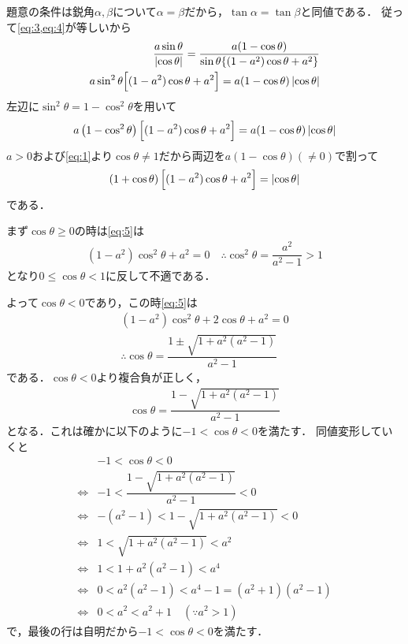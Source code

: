 \documentclass[../../main.tex]{subfiles}
\begin{document}
題意の条件は鋭角$\alpha,\beta$について$\alpha=\beta$だから，$\tan\alpha=\tan\beta$と同値である．
従って\cref{eq:3,eq:4}が等しいから
\begin{align}
  \dfrac{a\sin\theta}{\left|\cos\theta\right|} = \dfrac{a(1-\cos\theta)}{\sin\theta\{(1-a^2)\cos\theta + a^2\}} \\
  a\sin^2\theta\Bigl[(1-a^2)\cos\theta + a^2\Bigr] = a(1-\cos\theta)\left|\cos\theta \right|
\end{align}
左辺に$\sin^2\theta = 1-\cos^2\theta$を用いて
\begin{align}
  a\left(1-\cos^2\theta\right)\Bigl[(1-a^2)\cos\theta + a^2\Bigr] = a(1-\cos\theta)\left|\cos\theta \right|
\end{align}
$a>0$および\cref{eq:1}より$\cos\theta\neq 1$だから両辺を$a(1-\cos\theta) (\neq 0)$で割って
\begin{align}
  \left(1+\cos\theta\right)\Bigl[(1-a^2)\cos\theta + a^2\Bigr] = \left|\cos\theta \right| \label{eq:5}
\end{align}
である．

まず$\cos\theta\ge 0$の時は\cref{eq:5}は
\begin{align}
  (1-a^2)\cos^2\theta + a^2 = 0 \quad \therefore \cos^2\theta=\dfrac{a^2}{a^2-1}>1
\end{align}
となり$0\le \cos\theta<1$に反して不適である．

よって$\cos\theta<0$であり，この時\cref{eq:5}は
\begin{align}
  (1-a^2)\cos^2\theta + 2\cos\theta + a^2 = 0 \\
  \therefore
  \cos\theta = \dfrac{1\pm \sqrt{1+a^2(a^2-1)}}{a^2-1}
\end{align}
である．$\cos\theta<0$より複合負が正しく，
\begin{align}
  \cos\theta = \dfrac{1 - \sqrt{1+a^2(a^2-1)}}{a^2-1} \label{eq:6}
\end{align}
となる．これは確かに以下のように$-1<\cos\theta < 0$を満たす．
同値変形していくと
\begin{align}
  & -1 < \cos\theta < 0 \\
  \iff
  & -1 < \dfrac{1 - \sqrt{1+a^2(a^2-1)}}{a^2-1} < 0 \\
  \iff
  & -(a^2-1) < 1 - \sqrt{1+a^2(a^2-1)} < 0 \\
  \iff
  & 1 < \sqrt{1+a^2(a^2-1)} < a^2 \\
  \iff
  & 1 < 1 + a^2(a^2-1) < a^4 \\
  \iff
  & 0 < a^2(a^2-1) < a^4 -1 = (a^2+1)(a^2-1)\\
  \iff
  & 0 < a^2 < a^2+1 \quad (\because a^2 > 1)
\end{align}
で，最後の行は自明だから$-1<\cos\theta<0$を満たす．
\end{document}
